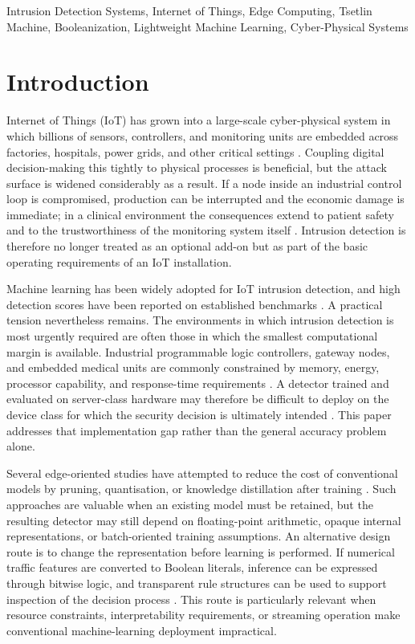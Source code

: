 \documentclass[journal,twoside,web]{ieeecolor}
\begin{document}
\begin{IEEEkeywords}
Intrusion Detection Systems,
Internet of Things,
Edge Computing,
Tsetlin Machine,
Booleanization,
Lightweight Machine Learning,
Cyber-Physical Systems
\end{IEEEkeywords}

\section{Introduction}
\label{sec:introduction}

 Internet of Things (IoT) has grown into a large-scale cyber-physical system in which billions of sensors, controllers, and monitoring units are embedded across factories, hospitals, power grids, and other critical settings \cite{hussain2020ml, algaradi2020survey}. Coupling digital decision-making this tightly to physical processes is beneficial, but the attack surface is widened considerably as a result. If a node inside an industrial control loop is compromised, production can be interrupted and the economic damage is immediate; in a clinical environment the consequences extend to patient safety and to the trustworthiness of the monitoring system itself \cite{zhukabayeva2025cybersecurity}. Intrusion detection is therefore no longer treated as an optional add-on but as part of the basic operating requirements of an IoT installation.

Machine learning has been widely adopted for IoT intrusion detection, and high detection scores have been reported on established benchmarks \cite{kikissagbe2024review, jouhari2024lightweight}. A practical tension nevertheless remains. The environments in which intrusion detection is most urgently required are often those in which the smallest computational margin is available. Industrial programmable logic controllers, gateway nodes, and embedded medical units are commonly constrained by memory, energy, processor capability, and response-time requirements \cite{wang2023lightweight}. A detector trained and evaluated on server-class hardware may therefore be difficult to deploy on the device class for which the security decision is ultimately intended \cite{kundu2025review}. This paper addresses that implementation gap rather than the general accuracy problem alone.

Several edge-oriented studies have attempted to reduce the cost of conventional models by pruning, quantisation, or knowledge distillation after training \cite{liu2025compression}. Such approaches are valuable when an existing model must be retained, but the resulting detector may still depend on floating-point arithmetic, opaque internal representations, or batch-oriented training assumptions. An alternative design route is to change the representation before learning is performed. If numerical traffic features are converted to Boolean literals, inference can be expressed through bitwise logic, and transparent rule structures can be used to support inspection of the decision process \cite{bacellar2017thermometer}. This route is particularly relevant when resource constraints, interpretability requirements, or streaming operation make conventional machine-learning deployment impractical.
\end{document}
